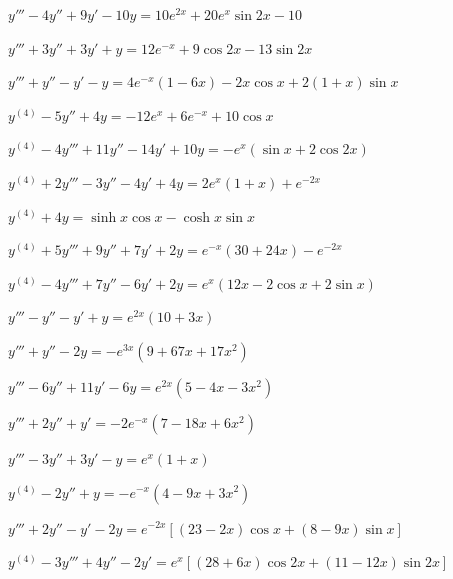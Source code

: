 \begin{exerciselist}
  \item\label{exer:9.3.51} $y'''-4y''+9y'-10y=10e^{2x}+20e^{x}\sin2x-10$

  \item\label{exer:9.3.52} $y'''+3y''+3y'+y=12e^{-x}+9\cos2x-13\sin2x$

  \item\label{exer:9.3.53} $y'''+y''-y'-y=4e^{-x}(1-6x)-2x\cos x+2(1+x)\sin x$

  \item\label{exer:9.3.54} $y^{(4)}-5y''+4y=-12e^{x}+6e^{-x}+10\cos x$

  \item\label{exer:9.3.55} $y^{(4)}-4y'''+11y''-14y'+10y=-e^{x}(\sin x+2\cos2x)$

  \item\label{exer:9.3.56} $y^{(4)}+2y'''-3y''-4y'+4y=2e^{x}(1+x)+e^{-2x}$

  \item\label{exer:9.3.57} $y^{(4)}+4y=\sinh x\cos x-\cosh x\sin x$

  \item\label{exer:9.3.58} $y^{(4)}+5y'''+9y''+7y'+2y=e^{-x}(30+24x)-e^{-2x}$

  \item\label{exer:9.3.59} $y^{(4)}-4y'''+7y''-6y'+2y=e^{x}(12x-2\cos x+2\sin x)$


  \item\label{exer:9.3.60} $y'''-y''-y'+y=e^{2x}(10+3x)$

  \item\label{exer:9.3.61} $y'''+y''-2y=-e^{3x}(9+67x+17x^{2})$

  \item\label{exer:9.3.62} $y'''-6y''+11y'-6y=e^{2x}(5-4x-3x^{2})$

  \item\label{exer:9.3.63} $y'''+2y''+y'=-2e^{-x}(7-18x+6x^{2})$

  \item\label{exer:9.3.64} $y'''-3y''+3y'-y=e^{x}(1+x)$

  \item\label{exer:9.3.65} $y^{(4)}-2y''+y=-e^{-x}(4-9x+3x^{2})$

  \item\label{exer:9.3.66} $y'''+2y''-y'-2y=e^{-2x}\left[(23-2x)\cos x+(8-9x)\sin x\right]$

  \item\label{exer:9.3.67} $y^{(4)}-3y'''+4y''-2y'=e^{x}\left[(28+6x)\cos 2x+(11-12x)\sin2x\right]$


\end{exerciselist}
